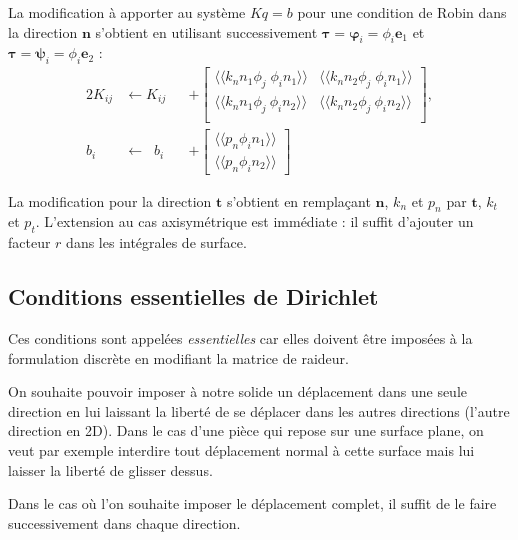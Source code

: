 \documentclass[12pt]{article}
\newcommand{\shapeu}{\boldsymbol{\varphi}}
\newcommand{\shapev}{\boldsymbol{\psi}}
\newcommand{\shapef}{\boldsymbol{\tau}}
\newcommand{\llangle}{\langle\!\langle}
\newcommand{\rrangle}{\rangle\!\rangle}
\begin{document}
La modification à apporter au système $K q = b$ pour une condition de Robin 
dans la direction $\mathbf{n}$ s'obtient en utilisant successivement 
$\shapef = \shapeu_i = \phi_i \mathbf{e}_1$ et 
$\shapef = \shapev_i=\phi_i \mathbf{e}_2$ :
\begin{alignat}{2}
    K_{ij} &\leftarrow K_{ij} &&+ 
    \begin{bmatrix}
        \llangle k_n n_1 \phi_j \; \phi_i n_1 \rrangle & 
        \llangle k_n n_2 \phi_j \; \phi_i n_1 \rrangle
        \\
        \llangle k_n n_1 \phi_j \: \phi_i n_2 \rrangle & 
        \llangle k_n n_2 \phi_j \: \phi_i n_2 \rrangle
        \\
    \end{bmatrix},\\
    b_i &\leftarrow \;\; b_i &&+
    \begin{bmatrix}
        \llangle p_n \phi_i n_1 \rrangle\\
        \llangle p_n \phi_i n_2 \rrangle
    \end{bmatrix}
\end{alignat}

La modification pour la direction $\mathbf{t}$ s'obtient en 
remplaçant $\mathbf{n}$, $k_n$ et $p_n$ par $\mathbf{t}$, $k_t$ et $p_t$.
L'extension au cas axisymétrique est immédiate : il suffit d'ajouter 
un facteur $r$ dans les intégrales de surface.


\subsection{Conditions essentielles de Dirichlet}
Ces conditions sont appelées \textit{essentielles} car elles doivent être
imposées à la formulation discrète en modifiant la matrice de raideur.

On souhaite pouvoir imposer à notre solide un déplacement dans une seule 
direction en lui laissant la liberté de se déplacer dans les autres directions
(l'autre direction en 2D). Dans le cas d'une pièce qui repose sur une 
surface plane, on veut par exemple interdire tout déplacement normal à cette 
surface mais lui laisser la liberté de glisser dessus.

Dans le cas où l'on souhaite imposer le déplacement complet, il suffit de le 
faire successivement dans chaque direction.
\end{document}
